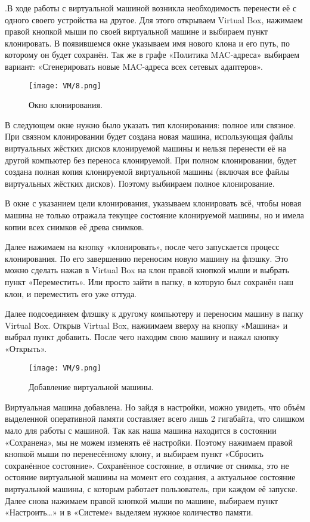.\quad В ходе работы с виртуальной машиной возникла необходимость перенести её с одного своего устройства на другое.
\newline Для этого открываем Virtual Box, нажимаем правой кнопкой мыши по своей виртуальной машине и выбираем пункт клонировать. В появившемся окне указываем имя нового клона и его путь, по которому он будет сохранён. Так же в графе «Политика MAC-адреса» выбираем вариант: «Сгенерировать новые MAC-адреса всех сетевых адаптеров».

\begin{figure}[h]		
		\centering
		\texttt{[image: VM/8.png]}
\caption{Окно клонирования.}
\label{ris:image}
\end{figure}

\quad В следующем окне нужно было указать тип клонирования: полное или связное. При связном клонировании будет создана новая машина, использующая файлы виртуальных жёстких дисков клонируемой машины и нельзя перенести её на другой компьютер без переноса клонируемой. При полном клонировании, будет создана полная копия клонируемой виртуальной машины (включая все файлы виртуальных жёстких дисков). Поэтому выбиираем полное клонирование.

\quad В окне с указанием цели клонирования, указываем клонировать всё, чтобы новая машина не только отражала текущее состояние клонируемой машины, но и имела копии всех снимков её древа снимков.

\quad Далее нажимаем на кнопку «клонировать», после чего запускается процесс клонирования. По его завершению переносим новую машину на флэшку. Это можно сделать нажав в Virtual Box на клон правой кнопкой мыши и выбрать пункт «Переместить». Или просто зайти в папку, в которую был сохранён наш клон, и переместить его уже оттуда.

\quad Далее подсоединяем флэшку к другому компьютеру и переносим машину в папку Virtual Box. Открыв Virtual Box, нажиимаем вверху на кнопку «Машина» и выбрал пункт добавить. После чего находим свою машину и нажал кнопку «Открыть».

\begin{figure}[h]
		\centering
		\texttt{[image: VM/9.png]}
\caption{Добавление виртуальной машины.}
\label{ris:image}
\end{figure}

\quad Виртуальная машина добавлена. Но зайдя в настройки, можно увидеть, что объём выделенной оперативной памяти составляет всего лишь 2 гигабайта, что слишком мало для работы с машиной. Так как наша машина находится в состоянии «Сохранена», мы не можем изменять её настройки. Поэтому нажимаем правой кнопкой мыши по перенесённому клону, и выбираем пункт «Сбросить сохранённое состояние». Сохранённое состояние, в отличие от снимка, это не остояние виртуальной машины на момент его создания, а актуальное состояние виртуальной машины, с которым работает пользователь, при каждом её запуске. Далее снова нажимаем правой кнопкой мыши по машине, выбираем пункт «Настроить…» и в «Системе» выделяем нужное количество памяти.

